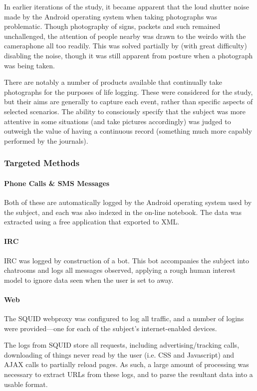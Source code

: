 In earlier iterations of the study, it became apparent that the loud shutter noise made by the Android operating system when taking photographs was problematic.  Though photography of signs, packets and such remained unchallenged, the attention of people nearby was drawn to the weirdo with the cameraphone all too readily.  This was solved partially by (with great difficulty) disabling the noise, though it was still apparent from posture when a photograph was being taken.

There are notably a number of products available that continually take photographs for the purposes of life logging.  These were considered for the study, but their aims are generally to capture each event, rather than specific aspects of selected scenarios.  The ability to consciously specify that the subject was more attentive in some situations (and take pictures accordingly) was judged to outweigh the value of having a continuous record (something much more capably performed by the journals).




\subsubsection{Targeted Methods}
\paragraph{Phone Calls \& SMS Messages}
Both of these are automatically logged by the Android operating system used by the subject, and each was also indexed in the on-line notebook.  The data was extracted using a free application that exported to XML.


\paragraph{IRC}
IRC was logged by construction of a bot.  This bot accompanies the subject into chatrooms and logs all messages observed, applying a rough human interest model to ignore data seen when the user is set to away.


\paragraph{Web}
The SQUID webproxy was configured to log all traffic, and a number of logins were provided---one for each of the subject's internet-enabled devices.

The logs from SQUID store all requests, including advertising/tracking calls, downloading of things never read by the user (i.e. CSS and Javascript) and AJAX calls to partially reload pages.  As such, a large amount of processing was necessary to extract URLs from these logs, and to parse the resultant data into a usable format.


